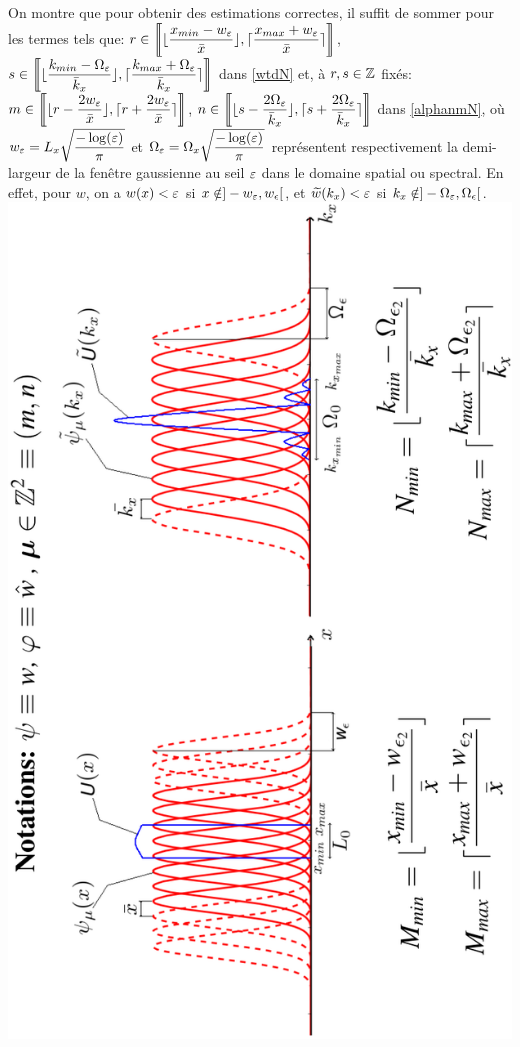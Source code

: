 On montre que pour obtenir des estimations correctes, il suffit de sommer pour les termes tels que:
$r\in\llb\lfloor\f[x_{min}-w_\eepsilon]{\b{x}}\rfloor,\lceil\f[x_{max}+w_\eepsilon]{\b{x}}\rceil\rrb$,
$s\in\llb\lfloor\f[k_{min}-\Omega_\eepsilon]{\b{k}_x}\rfloor,\lceil\f[k_{max}+\Omega_\eepsilon]{\b{k}_x}\rceil\rrb$
dans \eqref{wtdN} 
et, à $r,s\in\mathbb{Z}$ fixés:
$m\in\llb\lfloor r-\f[2w_\eepsilon]{\b{x}}\rfloor,\lceil r+\f[2w_\eepsilon]{\b{x}}\rceil\rrb$,
$n\in\llb\lfloor s-\f[2\Omega_\eepsilon]{\b{k}_x}\rfloor,\lceil s+\f[2\Omega_\eepsilon]{\b{k}_x}\rceil\rrb$
dans \eqref{alphanmN},
où $w_\eepsilon=L_x\r{\f[-\log(\eepsilon)]{\pi}}$ et $\Omega_\eepsilon=\Omega_x\r{\f[-\log(\eepsilon)]{\pi}}$
représentent respectivement la demi-largeur de la fenêtre gaussienne
au seil $\varepsilon$ dans le domaine spatial ou spectral.
En effet, pour $w$, on a $w(x)<\varepsilon$ si $x\notin]-w_\varepsilon,w_\epsilon[$,
et $\widetilde{w}(k_x)<\varepsilon$ si $k_x\notin]-\Omega_\varepsilon,\Omega_\epsilon[$.\\
\includegraphics[scale=0.8]{minmax.png}


